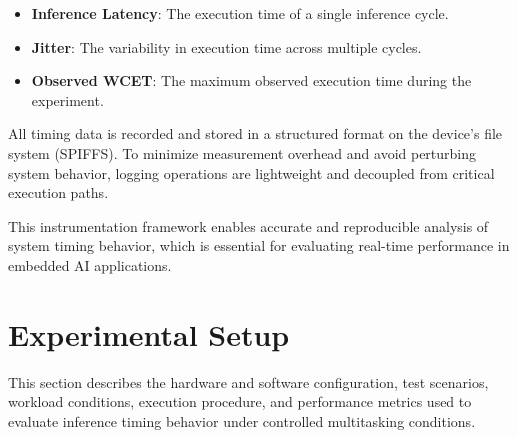 \documentclass[conference]{IEEEtran}
\begin{document}
\begin{itemize}
    \item \textbf{Inference Latency}: The execution time of a single inference cycle.
    \item \textbf{Jitter}: The variability in execution time across multiple cycles.
    \item \textbf{Observed WCET}: The maximum observed execution time during the experiment.
\end{itemize}

All timing data is recorded and stored in a structured format on the device’s file system (SPIFFS). To minimize measurement overhead and avoid perturbing system behavior, logging operations are lightweight and decoupled from critical execution paths.

This instrumentation framework enables accurate and reproducible analysis of system timing behavior, which is essential for evaluating real-time performance in embedded AI applications.

\section{Experimental Setup}
This section describes the hardware and software configuration, test scenarios, workload conditions, execution procedure, and performance metrics used to evaluate inference timing behavior under controlled multitasking conditions.

\end{document}
